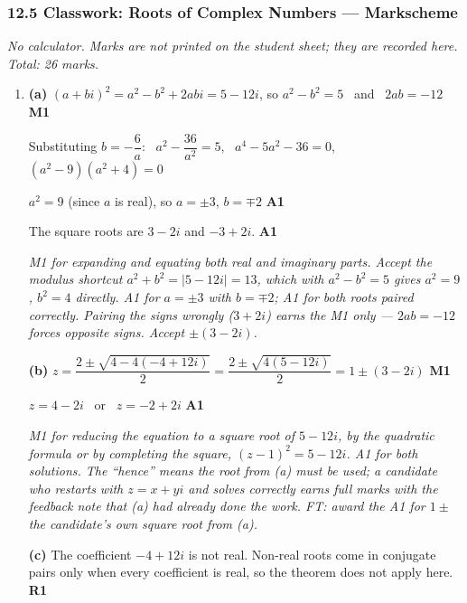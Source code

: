 \documentclass[12pt, twoside]{article}
\begin{document}
\subsubsection*{12.5 Classwork: Roots of Complex Numbers --- Markscheme}

\emph{No calculator. Marks are not printed on the student sheet; they are
recorded here. Total: 26 marks.}

\begin{enumerate}[itemsep=0.3cm]

\item[1.] [Maximum mark: 6]

\textbf{(a)} $(a + bi)^{2} = a^{2} - b^{2} + 2abi = 5 - 12i$, so
$a^{2} - b^{2} = 5$ \ and \ $2ab = -12$ \hfill \textbf{M1}

Substituting $b = -\dfrac{6}{a}$: \ $a^{2} - \dfrac{36}{a^{2}} = 5$, \
$a^{4} - 5a^{2} - 36 = 0$, \ $(a^{2} - 9)(a^{2} + 4) = 0$

$a^{2} = 9$ (since $a$ is real), so $a = \pm 3$, $b = \mp 2$
\hfill \textbf{A1}

The square roots are $3 - 2i$ and $-3 + 2i$. \hfill \textbf{A1}

\emph{M1 for expanding and equating both real and imaginary parts. Accept the
modulus shortcut $a^{2} + b^{2} = |5 - 12i| = 13$, which with
$a^{2} - b^{2} = 5$ gives $a^{2} = 9$, $b^{2} = 4$ directly. A1 for
$a = \pm 3$ with $b = \mp 2$; A1 for both roots paired correctly. Pairing the
signs wrongly ($3 + 2i$) earns the M1 only --- $2ab = -12$ forces opposite
signs. Accept $\pm(3 - 2i)$.}

\textbf{(b)} $z = \dfrac{2 \pm \sqrt{4 - 4(-4 + 12i)}}{2}
= \dfrac{2 \pm \sqrt{4(5 - 12i)}}{2} = 1 \pm (3 - 2i)$ \hfill \textbf{M1}

$z = 4 - 2i$ \ or \ $z = -2 + 2i$ \hfill \textbf{A1}

\emph{M1 for reducing the equation to a square root of $5 - 12i$, by the
quadratic formula or by completing the square, $(z - 1)^{2} = 5 - 12i$. A1 for
both solutions. The ``hence'' means the root from (a) must be used; a
candidate who restarts with $z = x + yi$ and solves correctly earns full marks
with the feedback note that (a) had already done the work. FT: award the A1 for
$1 \pm$ the candidate's own square root from (a).}

\textbf{(c)} The coefficient $-4 + 12i$ is not real. Non-real roots come in
conjugate pairs only when every coefficient is real, so the theorem does not
apply here. \hfill \textbf{R1}


\end{enumerate}
\end{document}

